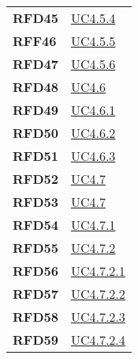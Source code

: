 \begin{longtable}[H]{>{\centering\bfseries}m{8cm} >{\centering\arraybackslash}m{8cm}}
    RFD45

    &  \hyperref[ssub:uc4.5.4]{UC4.5.4} \\

    RFF46
  
    &  \hyperref[ssub:uc4.5.5]{UC4.5.5} \\

    RFD47
 
    &  \hyperref[ssub:uc4.5.6]{UC4.5.6} \\

    RFD48

    &   \hyperref[ssub:uc4.6.1]{UC4.6} \\

    RFD49
 
    &   \hyperref[par:uc4.6.1]{UC4.6.1} \\

    RFD50
  
    &   \hyperref[par:uc4.6.2]{UC4.6.2} \\

    RFD51
  
    &   \hyperref[par:uc4.6.3]{UC4.6.3} \\

    RFD52
  
    &   \hyperref[ssub:uc4.7]{UC4.7} \\

    RFD53

    &   \hyperref[ssub:uc4.7]{UC4.7} \\

    RFD54
 
    &   \hyperref[par:uc4.7.1]{UC4.7.1} \\

    RFD55

    &   \hyperref[par:uc4.7.2]{UC4.7.2} \\

    RFD56
  
    &   \hyperref[spar:uc4.7.2.1]{UC4.7.2.1} \\

    RFD57
 
    &   \hyperref[spar:uc4.7.2.2]{UC4.7.2.2} \\

    RFD58
 
    &   \hyperref[spar:uc4.7.2.3]{UC4.7.2.3} \\

    RFD59
 
    &   \hyperref[spar:uc4.7.2.4]{UC4.7.2.4} \\


\end{longtable}
